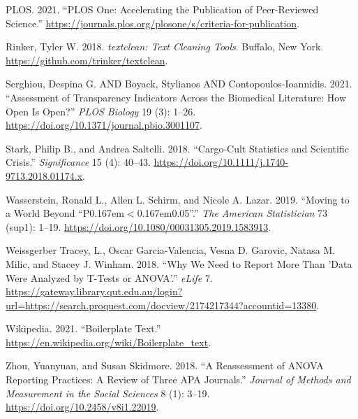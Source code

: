 \documentclass[
]{article}
\begin{document}
\leavevmode\hypertarget{ref-PLOS}{}%
PLOS. 2021. ``PLOS One: Accelerating the Publication of Peer-Reviewed Science.'' \url{https://journals.plos.org/plosone/s/criteria-for-publication}.

\leavevmode\hypertarget{ref-textclean}{}%
Rinker, Tyler W. 2018. \emph{textclean: Text Cleaning Tools}. Buffalo, New York. \url{https://github.com/trinker/textclean}.

\leavevmode\hypertarget{ref-Serghiou2021}{}%
Serghiou, Despina G. AND Boyack, Stylianos AND Contopoulos-Ioannidis. 2021. ``Assessment of Transparency Indicators Across the Biomedical Literature: How Open Is Open?'' \emph{PLOS Biology} 19 (3): 1--26. \url{https://doi.org/10.1371/journal.pbio.3001107}.

\leavevmode\hypertarget{ref-Stark2018}{}%
Stark, Philip B., and Andrea Saltelli. 2018. ``Cargo-Cult Statistics and Scientific Crisis.'' \emph{Significance} 15 (4): 40--43. \url{https://doi.org/10.1111/j.1740-9713.2018.01174.x}.

\leavevmode\hypertarget{ref-Wasserstein2019}{}%
Wasserstein, Ronald L., Allen L. Schirm, and Nicole A. Lazar. 2019. ``Moving to a World Beyond ``P0.167em\(\less\)0.167em0.05''.'' \emph{The American Statistician} 73 (sup1): 1--19. \url{https://doi.org/10.1080/00031305.2019.1583913}.

\leavevmode\hypertarget{ref-Weissgerber2018}{}%
Weissgerber Tracey, L., Oscar Garcia-Valencia, Vesna D. Garovic, Natasa M. Milic, and Stacey J. Winham. 2018. ``Why We Need to Report More Than 'Data Were Analyzed by T-Tests or ANOVA'.'' \emph{eLife} 7. \url{https://gateway.library.qut.edu.au/login?url=https://search.proquest.com/docview/2174217344?accountid=13380}.

\leavevmode\hypertarget{ref-Wikipedia}{}%
Wikipedia. 2021. ``Boilerplate Text.'' \url{https://en.wikipedia.org/wiki/Boilerplate_text}.

\leavevmode\hypertarget{ref-Zhou2018}{}%
Zhou, Yuanyuan, and Susan Skidmore. 2018. ``A Reassessment of ANOVA Reporting Practices: A Review of Three APA Journals.'' \emph{Journal of Methods and Measurement in the Social Sciences} 8 (1): 3--19. \url{https://doi.org/10.2458/v8i1.22019}.
\end{document}
